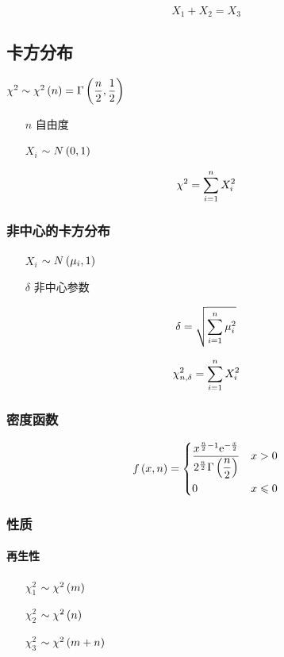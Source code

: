 \documentclass{article}
\begin{document}
\[X_1+X_2=X_3\]

\subsection{卡方分布}

$\chi^2\sim\chi^2\left(n\right)=\Gamma\left(\dfrac n2,\dfrac12\right)$

\begin{enumerate}
    \item [$n$] 自由度
    \item [$X_i$] $\sim N\left(0,1\right)$
\end{enumerate}

\[\chi^2=\sum_{i=1}^n X_i^2\]

\subsubsection{非中心的卡方分布}

\begin{enumerate}
    \item [$X_i$] $\sim N\left(\mu_i,1\right)$
    \item [$\delta$] 非中心参数
\end{enumerate}

\[\delta=\sqrt{\sum_{i=1}^n\mu_i^2}\]

\[\chi_{n,\delta}^2=\sum_{i=1}^n X_i^2\]

\subsubsection{密度函数}

\[f\left(x,n\right)=
    \left\{\begin{aligned}
         & \frac{x^{\frac n2-1}\mathrm e^{-\frac x2}}{2^{\frac n2}\Gamma\left(\dfrac n2\right)} &  & x>0         \\
         & 0                                                                    &  & x\leqslant0
    \end{aligned}\right.\]

\subsubsection{性质}

\paragraph{再生性}

\begin{enumerate}
    \item [$\chi_1^2$] $\sim\chi^2\left(m\right)$
    \item [$\chi_2^2$] $\sim\chi^2\left(n\right)$
    \item [$\chi_3^2$] $\sim\chi^2\left(m+n\right)$
\end{enumerate}
\end{document}
